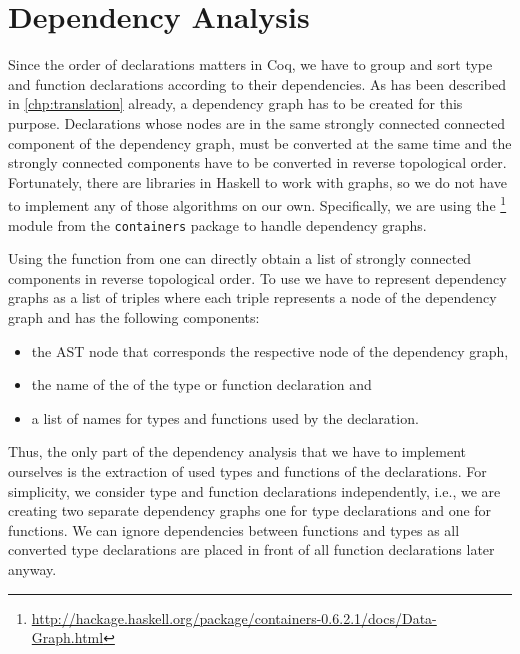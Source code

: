 \section{Dependency Analysis} \label{sec:implementation:dependency-analysis}
Since the order of declarations matters in Coq, we have to group and sort type and function declarations according to their dependencies.
As has been described in \autoref{chp:translation} already, a dependency graph has to be created for this purpose.
Declarations whose nodes are in the same strongly connected connected component of the dependency graph, must be converted at the same time and the strongly connected components have to be converted in reverse topological order.
Fortunately, there are libraries in Haskell to work with graphs, so we do not have to implement any of those algorithms on our own.
Specifically, we are using the  \footnote{\url{http://hackage.haskell.org/package/containers-0.6.2.1/docs/Data-Graph.html}} module from the \texttt{containers} package to handle dependency graphs.

Using the  function from  one can directly obtain a list of strongly connected components in reverse topological order.
To use  we have to represent dependency graphs as a list of triples where each triple represents a node of the dependency graph and has the following components:
\begin{itemize}
  \item the AST node that corresponds the respective node of the dependency graph,
  \item the name of the of the type or function declaration and
  \item a list of names for types and functions used by the declaration.
\end{itemize}
Thus, the only part of the dependency analysis that we have to implement ourselves is the extraction of used types and functions of the declarations.
For simplicity, we consider type and function declarations independently, i.e., we are creating two separate dependency graphs one for type declarations and one for functions.
We can ignore dependencies between functions and types as all converted type declarations are placed in front of all function declarations later anyway.

